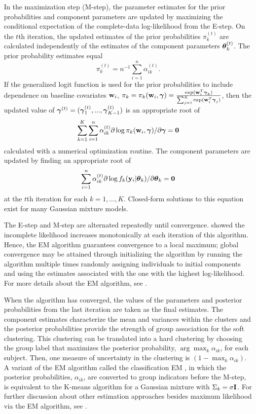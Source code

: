 In the maximization step (M-step), the parameter estimates for the prior probabilities and component parameters are updated by maximizing the conditional expectation of the complete-data log-likelihood from the E-step. On the $t$th iteration, the updated estimates of the prior probabilities $\pi_{k}^{(t)}$ are calculated independently of the estimates of the component parameters $\boldsymbol\theta_{k}^{(t)}$. The prior probability estimates equal 
$$\pi_{k}^{(t)}=n^{-1}\sum^{n}_{i=1}\alpha_{ik}^{(t)}.$$
If the generalized logit function is used for the prior probabilities to include dependence on baseline covariates $\mathbf w_{i}$, $\pi_{k}=\pi_{k}(\mathbf w_{i},\boldsymbol\gamma) = \frac{\exp(\mathbf w_{i}^T \boldsymbol \gamma_k) }{\sum_{j=1}^K \exp(\mathbf w_{i}^T \boldsymbol \gamma_j)}$, then the updated value of $\boldsymbol\gamma^{(t)}=(\boldsymbol\gamma_{1}^{(t)},...,\boldsymbol\gamma_{K-1}^{(t)})$ is an appropriate root of 
$$\sum^{K}_{k=1}\sum^{n}_{i=1}\alpha_{ik}^{(t)}\partial\log \pi_{k}(\mathbf w_{i},\boldsymbol\gamma)/\partial \boldsymbol\gamma = \mathbf 0$$
calculated with a numerical optimization routine. The component parameters are updated by finding an appropriate root of 
$$\sum^{n}_{i=1}\alpha_{ik}^{(t)}\partial\log f_{k}(\mathbf y_{i}|\boldsymbol\theta_k) /\partial \boldsymbol\theta_{k} =\mathbf 0$$
at the $t$th iteration for each $k=1,...,K$. Closed-form solutions to this equation exist for many Gaussian mixture models.  

The E-step and M-step are alternated repeatedly until convergence. \Textcite{dempster1977} showed the incomplete likelihood increases monotonically at each iteration of this algorithm. Hence, the EM algorithm guarantees convergence to a local maximum; global convergence may be attained through initializing the algorithm by running the algorithm multiple times randomly assigning individuals to initial components and using the estimates associated with the one with the highest log-likelihood. For more details about the EM algorithm, see \textcite{mclachlan1997}. 

When the algorithm has converged, the values of the parameters and posterior probabilities from the last iteration are taken as the final estimates. The component estimates characterize the mean and variances within the clusters and the posterior probabilities provide the strength of group association for the soft clustering. This clustering can be translated into a hard clustering by choosing the group label that maximizes the posterior probability, $\arg\max_k \alpha_{ik}$, for each subject. Then, one measure of uncertainty in the clustering is $(1-\max_k\alpha_{ik}).$ A variant of the EM algorithm called the classification EM \cite{celeux1992}, in which the posterior probabilities, $\alpha_{ik}$, are converted to group indicators before the M-step, is equivalent to the K-means algorithm for a Gaussian mixture with $\Sigma_{k} =\sigma \mathbf I$. For further discussion about other estimation approaches besides maximum likelihood via the EM algorithm, see \textcite{mclachlan2000}.

